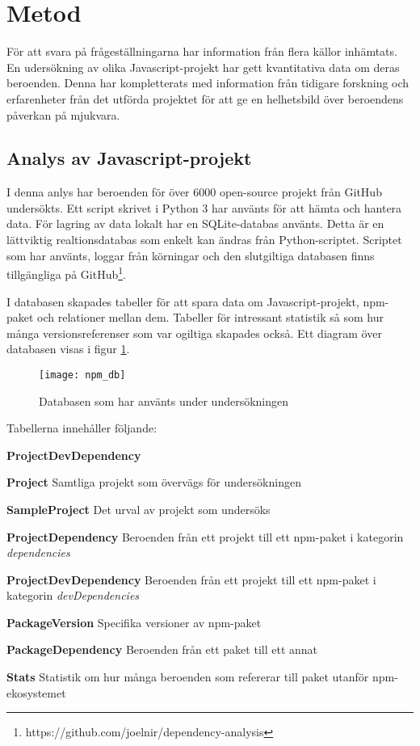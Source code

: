 \section{Metod}
\label{sec:joel_o-method}
För att svara på frågeställningarna har information från flera källor inhämtats. En udersökning av olika Javascript-projekt har gett kvantitativa data om deras beroenden. Denna har kompletterats med information från tidigare forskning och erfarenheter från det utförda projektet för att ge en helhetsbild över beroendens påverkan på mjukvara.

\subsection{Analys av Javascript-projekt}
\label{subsec:joel_o-method-analys}
I denna anlys har beroenden för över 6000 open-source projekt från GitHub undersökts. Ett script skrivet i Python 3 har använts för att hämta och hantera data. För lagring av data lokalt har en SQLite-databas använts. Detta är en lättviktig realtionsdatabas som enkelt kan ändras från Python-scriptet. Scriptet som har använts, loggar från körningar och den slutgiltiga databasen finns tillgängliga på GitHub\footnote{https://github.com/joelnir/dependency-analysis}.

I databasen skapades tabeller för att spara data om Javascript-projekt, npm-paket och relationer mellan dem. Tabeller för intressant statistik så som hur många versionsreferenser som var ogiltiga skapades också. Ett diagram över databasen visas i figur \ref{fig:dependency-db}.

\begin{figure}[ht]
  \centering
  \texttt{[image: npm\_db]}
  \caption{Databasen som har använts under undersökningen}
  \label{fig:dependency-db}
\end{figure}

Tabellerna innehåller följande:

\begin{labeling}{\textbf{ProjectDevDependency}}
  \item [\textbf{Project}] Samtliga projekt som övervägs för undersökningen
  \item [\textbf{SampleProject}] Det urval av projekt som undersöks
  \item [\textbf{ProjectDependency}] Beroenden från ett projekt till ett npm-paket i kategorin \textit{dependencies}
  \item [\textbf{ProjectDevDependency}] Beroenden från ett projekt till ett npm-paket i kategorin \textit{devDependencies}
  \item [\textbf{PackageVersion}] Specifika versioner av npm-paket
  \item [\textbf{PackageDependency}] Beroenden från ett paket till ett annat
  \item [\textbf{Stats}] Statistik om hur många beroenden som refererar till paket utanför npm-ekosystemet
\end{labeling}

